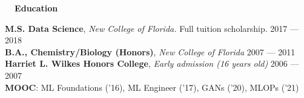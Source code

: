 \documentclass[a4paper,12pt]{article}
\newcommand{\resheading}[1]{{\vspace*{.001in} \colorbox{mygrey}{\begin{minipage}{\textwidth}{\textmd{\large \textbf{#1} \vphantom{p\^{E}}}}\end{minipage}}} }
\begin{document}
\resheading{~~Education}

\textbf{M.S. Data Science}, \textit{New College of Florida.} Full tuition scholarship. \hfill 2017 --- 2018\\
\textbf{B.A., Chemistry/Biology (Honors)}, \textit{New College of Florida} \hfill 2007 --- 2011\\
\textbf{Harriet L. Wilkes Honors College}, \textit{Early admission (16 years old)} \hfill 2006 --- 2007\\
\textbf{MOOC}: ML Foundations ('16), ML Engineer ('17), GANs ('20), MLOPs ('21)
\end{document}
